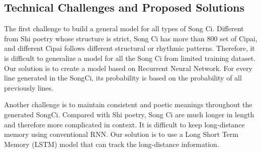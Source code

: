 \subsection{Technical Challenges and Proposed Solutions}
%
The first challenge to build a general model for all types of Song Ci.
%
Different from Shi poetry whose structure is strict,  Song Ci has more than 800 set of Cipai, and different Cipai follows different structural or rhythmic patterns.
%
Therefore, it is difficult to generalize a model for all the Song Ci from limited training dataset.
% 
Our solution is to create a model based on Recurrent Neural Network. For every line generated in the SongCi, its probability is based on the probability of all previously lines.

Another challenge is to maintain consistent and poetic meanings throughout the generated SongCi.
%
Compared with Shi poetry, Song Ci are much longer in length and therefore more complicated in context.
%
It is difficult to keep long-distance memory using conventional RNN.
% 
Our solution is to use a Long Short Term Memory (LSTM) model that can track the long-distance information. 
